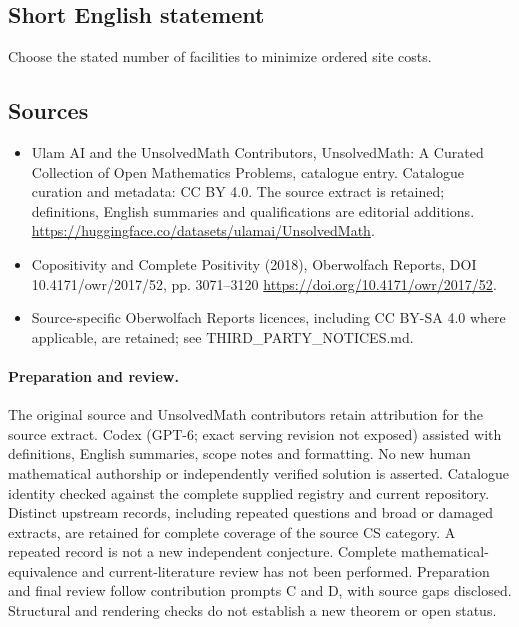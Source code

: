 \documentclass[11pt]{article}
\begin{document}
\subsection{Short English statement}
Choose the stated number of facilities to minimize ordered site costs.
\subsection{Sources}
\begin{itemize}
\item[\hypertarget{source:statement:1}{S1}] Ulam AI and the UnsolvedMath Contributors, UnsolvedMath: A Curated Collection of Open Mathematics Problems, catalogue entry. Catalogue curation and metadata: CC BY 4.0. The source extract is retained; definitions, English summaries and qualifications are editorial additions.
\url{https://huggingface.co/datasets/ulamai/UnsolvedMath}.
\item[\hypertarget{source:statement:2}{S2}] Copositivity and Complete Positivity (2018), Oberwolfach Reports, DOI 10.4171/owr/2017/52, pp. 3071--3120
\url{https://doi.org/10.4171/owr/2017/52}.
\item Source-specific Oberwolfach Reports licences, including CC BY-SA 4.0 where applicable, are retained; see THIRD\_PARTY\_NOTICES.md.
\end{itemize}
\paragraph{Preparation and review.}
The original source and UnsolvedMath contributors retain attribution for the source extract. Codex (GPT-6; exact serving revision not exposed) assisted with definitions, English summaries, scope notes and formatting. No new human mathematical authorship or independently verified solution is asserted. Catalogue identity checked against the complete supplied registry and current repository. Distinct upstream records, including repeated questions and broad or damaged extracts, are retained for complete coverage of the source CS category. A repeated record is not a new independent conjecture. Complete mathematical-equivalence and current-literature review has not been performed. Preparation and final review follow contribution prompts C and D, with source gaps disclosed. Structural and rendering checks do not establish a new theorem or open status.
\label{end:statement}
\end{document}

